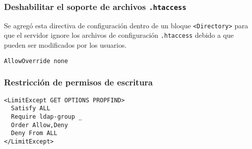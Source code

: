         \subsubsection{Deshabilitar el soporte de archivos \texttt{.htaccess}}

Se agreg\'{o} esta directiva de configuraci\'{o}n dentro de un bloque \texttt{<Directory>} para que el servidor ignore los archivos de configuraci\'{o}n \texttt{.htaccess} debido a que pueden ser modificados por los usuarios.

{
\scriptsize
\linespread{1}
\begin{verbatim}
AllowOverride none
\end{verbatim}
}

        \subsubsection{Restricci\'{o}n de permisos de escritura}

{
\begin{table}[H]
\caption{Clasificaci\'{o}n de m\'{e}todos \textsc{HTTP}}{}
\label{tab:http-methods}
\noindent{} %
\end{table}
}

{
\scriptsize
\linespread{1}
\begin{verbatim}
<LimitExcept GET OPTIONS PROPFIND>
  Satisfy ALL
  Require ldap-group _
  Order Allow,Deny
  Deny From ALL
</LimitExcept>
\end{verbatim}
}

